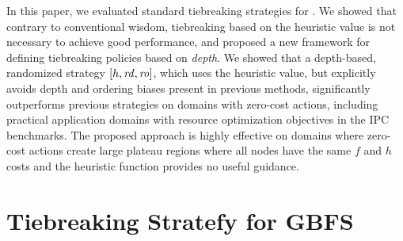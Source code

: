 In this paper, we evaluated standard tiebreaking
strategies for \astar.
We showed that contrary to conventional wisdom, tiebreaking based on the heuristic value is not necessary to achieve good performance, and proposed
a new framework for defining tiebreaking policies based on \emph{depth}.
We showed that a depth-based, randomized strategy $[h,{\mbox{\textit{rd}}},{\mbox{\textit{ro}}}]$, which uses the heuristic value, but explicitly avoids depth and ordering biases present in previous methods,
significantly outperforms previous strategies on domains with zero-cost actions, 
including practical application domains with resource optimization objectives in the IPC benchmarks.
The proposed approach is highly effective on domains where zero-cost actions create large plateau regions where all nodes have the same $f$ and $h$ costs
and the heuristic function provides no useful guidance.




\section{Tiebreaking Stratefy for GBFS}

\label{sec:gbfs}



